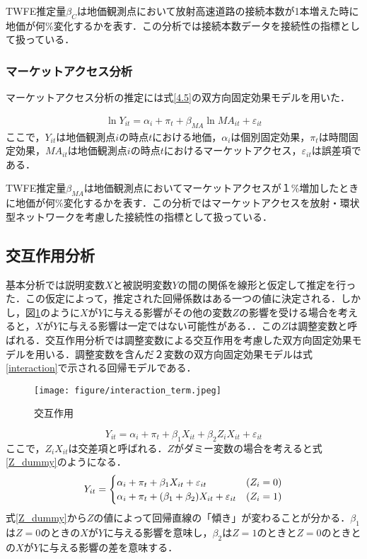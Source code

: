 TWFE推定量$\beta_{C}$は地価観測点において放射高速道路の接続本数が1本増えた時に地価が何\%変化するかを表す．この分析では接続本数データを接続性の指標として扱っている．

\subsubsection{マーケットアクセス分析}
マーケットアクセス分析の推定には式\ref{4.5}の双方向固定効果モデルを用いた．

\begin{eqnarray}
  \ln{Y_{it}}= \alpha_{i} + \pi_{t} + \beta_{MA}\ln{{MA}_{it}}+ \varepsilon_{it}
    \label{4.5}
\end{eqnarray}  
ここで，$Y_{it}$は地価観測点$i$の時点$t$における地価，$\alpha_{i}$は個別固定効果，$\pi_{t}$は時間固定効果，$MA_{it}$は地価観測点$i$の時点$t$におけるマーケットアクセス，$\varepsilon_{it}$は誤差項である．

TWFE推定量$\beta_{MA}$は地価観測点においてマーケットアクセスが１\%増加したときに地価が何\%変化するかを表す．この分析ではマーケットアクセスを放射・環状型ネットワークを考慮した接続性の指標として扱っている．




\subsection{交互作用分析}
基本分析では説明変数$X$と被説明変数$Y$の間の関係を線形と仮定して推定を行った．この仮定によって，推定された回帰係数はある一つの値に決定される．しかし，図\ref{interaction_term}のように$X$が$Y$に与える影響がその他の変数$Z$の影響を受ける場合を考えると，$X$が$Y$に与える影響は一定ではない可能性がある．．この$Z$は調整変数と呼ばれる．交互作用分析では調整変数による交互作用を考慮した双方向固定効果モデルを用いる．調整変数を含んだ２変数の双方向固定効果モデルは式\ref{interaction}で示される回帰モデルである．
\begin{figure}[H]
  \centering
  \texttt{[image: figure/interaction\_term.jpeg]}
  \caption{交互作用}
  \label{interaction_term}
\end{figure}
\begin{equation}
  Y_{it} = \alpha_{i} + \pi_{t} + \beta_{1}X_{it} + \beta_{2}Z_{i}X_{it} + \varepsilon_{it}
  \label{interaction}
\end{equation}
ここで，$Z_{i}X_{it}$は交差項と呼ばれる．$Z$がダミー変数の場合を考えると式\ref{Z_dummy}のようになる．
\begin{equation}
  Y_{it} =
  \begin{cases}
    \alpha_{i} + \pi_{t} + \beta_{1}X_{it}  + \varepsilon_{it} & \text (Z_{i} = 0) \\
    \alpha_{i} + \pi_{t} + (\beta_{1}+\beta_{2})X_{it} + \varepsilon_{it} & \text (Z_{i} = 1)
  \end{cases}
  \label{Z_dummy}
\end{equation}
式\ref{Z_dummy}から$Z$の値によって回帰直線の「傾き」が変わることが分かる．$\beta_{1}$は$Z=0$のときの$X$が$Y$に与える影響を意味し，$\beta_{2}$は$Z=1$のときと$Z=0$のときとの$X$が$Y$に与える影響の差を意味する．

